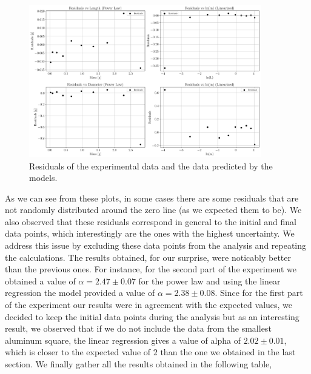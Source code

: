 \documentclass[a4paper,12pt]{article}
\begin{document}
\begin{figure}[h!]
    \centering
    \includegraphics[width = 0.9\textwidth]{residuals.png}
    \caption{Residuals of the experimental data and the data predicted by the models.}
    \label{fig:residuals}
\end{figure}
 
As we can see from these plots, in some cases there are some residuals that are not randomly distributed 
around the zero line (as we expected them to be). We also observed that these residuals correspond in general 
to the initial and final data points, which interestingly are the ones with the highest uncertainty. We address 
this issue by excluding these data points from the analysis and repeating the calculations. The results obtained, 
for our surprise, were noticably better than the previous ones. For instance, for the second part of the experiment
we obtained a value of $\alpha = 2.47 \pm 0.07$ for the power law and using the linear regression the model provided 
a value of $\alpha = 2.38 \pm 0.08$. Since for the first part of the experiment our results were in agreement with the
expected values, we decided to keep the initial data points during the analysis but as an interesting result, we 
observed that if we do not include the data from the smallest aluminum square, the linear regression gives a value of 
alpha of $2.02 \pm 0.01$, which is closer to the expected value of $2$ than the one we obtained in the last section. 
We finally gather all the results obtained in the following table, 
\end{document}
